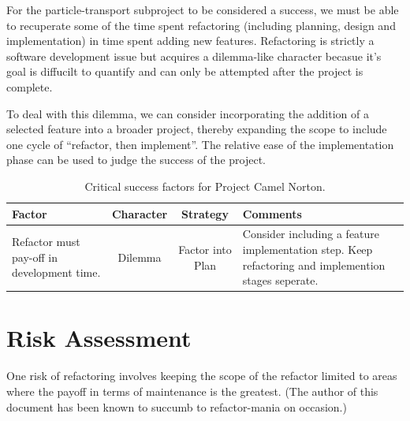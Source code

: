 \documentclass[11pt]{nmemo}
\begin{document}
For the particle-transport subproject to be considered a success, we
must be able to recuperate some of the time spent refactoring
(including planning, design and implementation) in time spent adding
new features. Refactoring is strictly a software development issue but
acquires a dilemma-like character becasue it's goal is diffucilt to
quantify and can only be attempted after the project is complete.

To deal with this dilemma, we can consider incorporating the addition
of a selected feature into a broader project, thereby expanding the
scope to include one cycle of ``refactor, then implement''. The
relative ease of the implementation phase can be used to judge the
success of the project.


\begin{table}[ht]
  \begin{center}
    \caption{Critical success factors for Project Camel Norton.}
    \label{tab:critical-success}
    \begin{tabular}{|p{4.5cm}|c|c|p{4.5cm}|} 
    \hline
    Factor             &  Character   & Strategy & Comments \\ 
    \hline\hline
    Refactor must pay-off in development time.
    & Dilemma & Factor into Plan 
    & Consider including a feature implementation step. Keep
    refactoring and implemention stages seperate. \\ 
    \hline
    \end{tabular}
  \end{center}
\end{table}


\newpage
\section*{Risk Assessment}

One risk of refactoring involves keeping the scope of the refactor
limited to areas where the payoff in terms of maintenance is the
greatest. (The author of this document has been known to succumb to
refactor-mania on occasion.)
\end{document}
